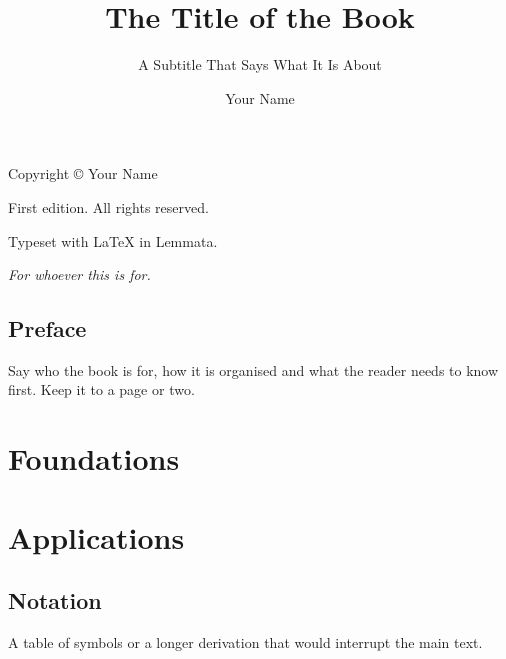 \documentclass[11pt,a5paper,twoside,openright,headings=small]{scrbook}
\title{The Title of the Book}
\subtitle{A Subtitle That Says What It Is About}
\author{Your Name}
\date{\the\year}
\begin{document}
\frontmatter
\maketitle

\begin{titlepage}\thispagestyle{empty}
  \null\vfill
  \small
  Copyright \copyright{} \the\year{} Your Name\par
  First edition. All rights reserved.\par
  Typeset with \LaTeX{} in Lemmata.
\end{titlepage}

\cleardoublepage
\thispagestyle{empty}
\null\vspace{4cm}
\begin{center}\itshape For whoever this is for.\end{center}

\cleardoublepage
\tableofcontents

\chapter*{Preface}
Say who the book is for, how it is organised and what the reader needs to know first.
Keep it to a page or two.

\mainmatter

\part{Foundations}



\part{Applications}

\appendix
\chapter{Notation}
A table of symbols or a longer derivation that would interrupt the main text.

\backmatter
\printbibliography[heading=bibintoc]
\end{document}
